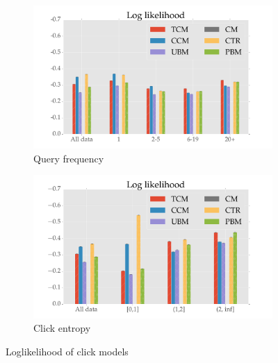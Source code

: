 \begin{figure}
	\centering
	\begin{subfigure}[b]{.49\textwidth}
	\centering
		\includegraphics[width=\textwidth]{figures/LL_qf.pdf}
		\caption{Query frequency}
		\label{fig:ll_qf}
	\end{subfigure}
	\begin{subfigure}[b]{.49\textwidth}
		\centering
		\includegraphics[width=\textwidth]{figures/LL_ce.pdf}
		\caption{Click entropy}
		\label{fig:ll_ce}
	\end{subfigure}
	\caption{Loglikelihood of click models}
	\label{fig:ll}
\end{figure}


